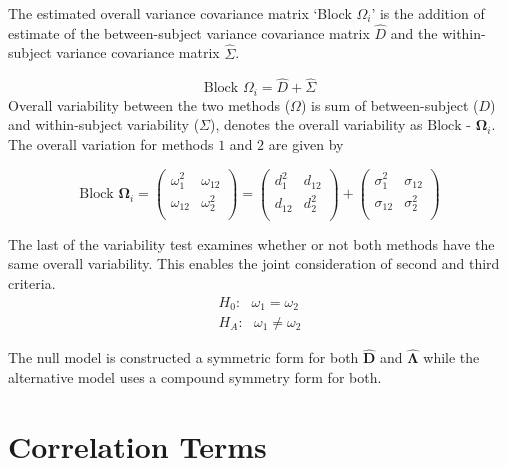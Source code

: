 \documentclass[12pt, a4paper]{report}
\theoremstyle{plain}
\theoremstyle{definition}
\theoremstyle{remark}
\begin{document}
		The estimated overall variance covariance matrix `Block
		$\Omega_{i}$' is the addition of estimate of the between-subject variance covariance matrix $\hat{D}$ and the within-subject variance covariance matrix $\hat{\Sigma}$.
		
		\begin{equation}
		\mbox{Block  }\Omega_{i} = \hat{D} + \hat{\Sigma}
		\end{equation}
		Overall variability between the two methods ($\Omega$) is sum of between-subject ($D$) and within-subject variability ($\Sigma$),
		\citet{ARoy2009} denotes the overall variability	as ${\mbox{Block - }\boldsymbol \Omega_{i}}$. The overall variation for methods $1$ and $2$ are given by
		
		\begin{center}
			\[\mbox{Block } \boldsymbol{\Omega}_i = \left(\begin{array}{cc}
			\omega^2_1  & \omega_{12} \\
			\omega_{12} & \omega^2_2 \\
			\end{array}  \right)
			=  \left(
			\begin{array}{cc}
			d^2_1  & d_{12} \\
			d_{12} & d^2_2 \\
			\end{array} \right)+
			\left(
			\begin{array}{cc}
			\sigma^2_1  & \sigma_{12} \\
			\sigma_{12} & \sigma^2_2 \\
			\end{array}\right)
			\]
		\end{center}
		
	The last of the variability test examines whether or not both methods have the same overall variability. This enables the joint consideration of second and third criteria.
	\begin{eqnarray*}
		H_{0}: \mbox{ }\omega_{1}  = \omega_{2} \\
		H_{A}: \mbox{ }\omega_{1}  \neq \omega_{2}
	\end{eqnarray*}
	
	The null model is constructed a symmetric form for both $\boldsymbol{\hat{D}}$ and $\boldsymbol{\hat{\Lambda}}$ while the alternative model uses a compound symmetry form for both.
	
	

	


	
\section{Correlation Terms}
	
\end{document}

